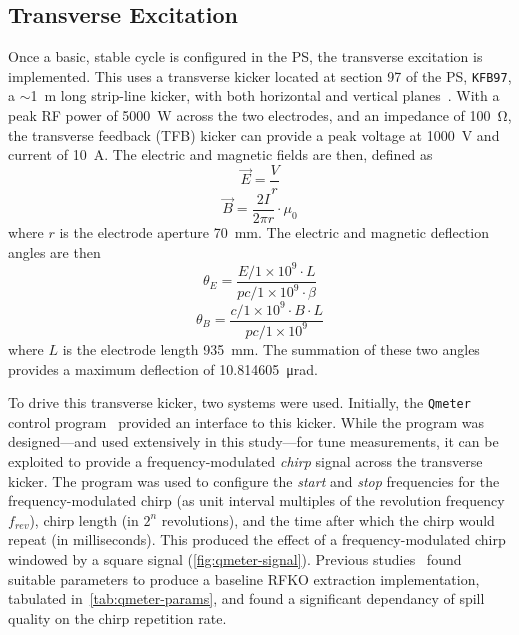 \documentclass[11pt]{report}
\begin{document}
\subsection{Transverse Excitation}\label{sec:trans_exc}
Once a basic, stable cycle is configured in the PS, the transverse excitation is implemented. This uses a transverse kicker located at section 97 of the PS, \verb|KFB97|, a $\sim$\qty{1}{\meter} long strip-line kicker, with both horizontal and vertical planes~\cite{Sterbini:2158994}. With a peak RF power of \qty{5000}{\watt} across the two electrodes, and an impedance of \qty{100}{\ohm}, the transverse feedback (TFB) kicker can provide a peak voltage at \qty{1000}{\volt} and current of \qty{10}{\ampere}. The electric and magnetic fields are then, defined as
\begin{equation}
  \vec E=\frac Vr
\end{equation}
\begin{equation}
  \vec B=\frac {2I}{2\pi r}\cdot \mu_0
\end{equation}
where $r$ is the electrode aperture \qty{70}{\milli\meter}. The electric and magnetic deflection angles are then~\cite[3.1-3.2]{bouvet}
\begin{equation}
  \theta_E = \frac{E / 1\times10^9\cdot L}{pc/1\times10^9 \cdot\beta}
  \label{eq:kick-electric}
\end{equation}
\begin{equation}
  \theta_B = \frac{c/1\times10^9\cdot B\cdot L}{pc/1\times10^9}
  \label{eq:kick-magnetic}
\end{equation} where $L$ is the electrode length \qty{935}{\milli\meter}.
The summation of these two angles provides a maximum deflection of \qty{10.814605}{\micro\radian}.

To drive this transverse kicker, two systems were used. Initially, the \verb|Qmeter| control program~\cite{Gasior:895142} provided an interface to this kicker. While the program was designed---and used extensively in this study---for tune measurements, it can be exploited to provide a frequency-modulated \textit{chirp} signal across the transverse kicker. The program was used to configure the \textit{start} and \textit{stop} frequencies for the frequency-modulated chirp (as unit interval multiples of the revolution frequency $f_{rev}$), chirp length (in $2^n$ revolutions), and the time after which the chirp would repeat (in milliseconds). This produced the effect of a frequency-modulated chirp windowed by a square signal (\autoref{fig:qmeter-signal}). Previous studies~\cite{ipac} found suitable parameters to produce a baseline RFKO extraction implementation, tabulated in~\autoref{tab:qmeter-params}, and found a significant dependancy of spill quality on the chirp repetition rate.
\end{document}
